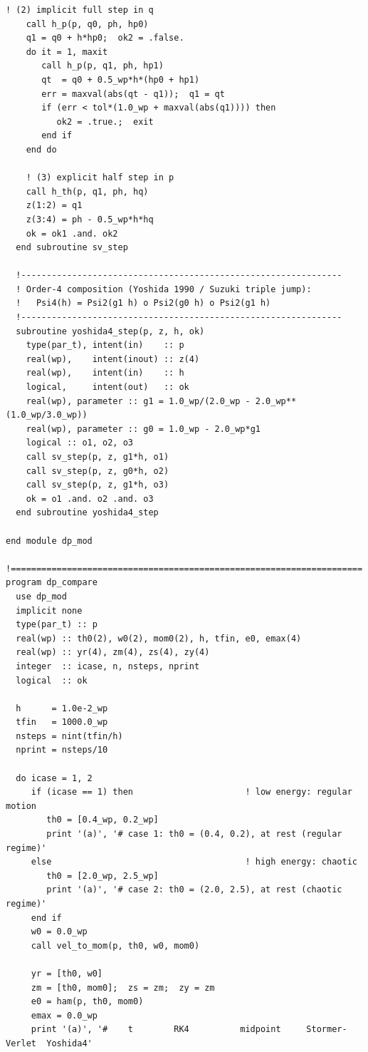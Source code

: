 \documentclass[11pt,a4paper]{book}
\theoremstyle{definition}
\theoremstyle{remark}
\begin{document}
\begin{lstlisting}[language={[95]Fortran},basicstyle=\ttfamily\scriptsize]
    ! (2) implicit full step in q
    call h_p(p, q0, ph, hp0)
    q1 = q0 + h*hp0;  ok2 = .false.
    do it = 1, maxit
       call h_p(p, q1, ph, hp1)
       qt  = q0 + 0.5_wp*h*(hp0 + hp1)
       err = maxval(abs(qt - q1));  q1 = qt
       if (err < tol*(1.0_wp + maxval(abs(q1)))) then
          ok2 = .true.;  exit
       end if
    end do

    ! (3) explicit half step in p
    call h_th(p, q1, ph, hq)
    z(1:2) = q1
    z(3:4) = ph - 0.5_wp*h*hq
    ok = ok1 .and. ok2
  end subroutine sv_step

  !---------------------------------------------------------------
  ! Order-4 composition (Yoshida 1990 / Suzuki triple jump):
  !   Psi4(h) = Psi2(g1 h) o Psi2(g0 h) o Psi2(g1 h)
  !---------------------------------------------------------------
  subroutine yoshida4_step(p, z, h, ok)
    type(par_t), intent(in)    :: p
    real(wp),    intent(inout) :: z(4)
    real(wp),    intent(in)    :: h
    logical,     intent(out)   :: ok
    real(wp), parameter :: g1 = 1.0_wp/(2.0_wp - 2.0_wp**(1.0_wp/3.0_wp))
    real(wp), parameter :: g0 = 1.0_wp - 2.0_wp*g1
    logical :: o1, o2, o3
    call sv_step(p, z, g1*h, o1)
    call sv_step(p, z, g0*h, o2)
    call sv_step(p, z, g1*h, o3)
    ok = o1 .and. o2 .and. o3
  end subroutine yoshida4_step

end module dp_mod

!=====================================================================
program dp_compare
  use dp_mod
  implicit none
  type(par_t) :: p
  real(wp) :: th0(2), w0(2), mom0(2), h, tfin, e0, emax(4)
  real(wp) :: yr(4), zm(4), zs(4), zy(4)
  integer  :: icase, n, nsteps, nprint
  logical  :: ok

  h      = 1.0e-2_wp
  tfin   = 1000.0_wp
  nsteps = nint(tfin/h)
  nprint = nsteps/10

  do icase = 1, 2
     if (icase == 1) then                      ! low energy: regular motion
        th0 = [0.4_wp, 0.2_wp]
        print '(a)', '# case 1: th0 = (0.4, 0.2), at rest (regular regime)'
     else                                      ! high energy: chaotic
        th0 = [2.0_wp, 2.5_wp]
        print '(a)', '# case 2: th0 = (2.0, 2.5), at rest (chaotic regime)'
     end if
     w0 = 0.0_wp
     call vel_to_mom(p, th0, w0, mom0)

     yr = [th0, w0]
     zm = [th0, mom0];  zs = zm;  zy = zm
     e0 = ham(p, th0, mom0)
     emax = 0.0_wp
     print '(a)', '#    t        RK4          midpoint     Stormer-Verlet  Yoshida4'


\end{lstlisting}
\end{document}
